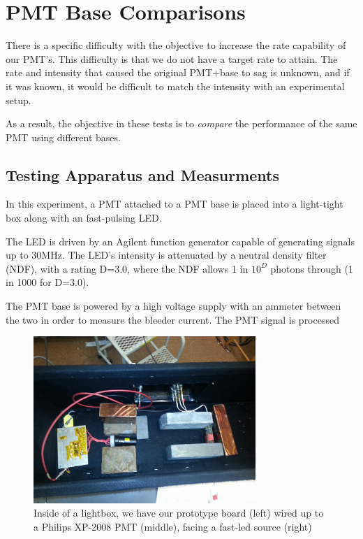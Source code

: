 \section{PMT Base Comparisons}

There is a specific difficulty with the objective to increase the rate capability of our PMT's. This difficulty is that we do not have a target rate to attain. The rate and intensity that caused the original PMT+base to sag is unknown, and if it was known, it would be difficult to match the intensity with an experimental setup.

As a result, the objective in these tests is to \emph{compare} the performance of the same PMT using different bases.

\subsection{Testing Apparatus and Measurments}

In this experiment, a PMT attached to a PMT base is placed into a light-tight box along with an fast-pulsing LED. 

The LED is driven by an Agilent function generator capable of generating signals up to 30MHz. The LED's intensity is attenuated by a neutral density filter (NDF), with a rating D=3.0, where the NDF allows 1 in $10^D$ photons through (1 in 1000 for D=3.0).

The PMT base is powered by a high voltage supply with an ammeter between the two in order to measure the bleeder current. The PMT signal is processed 

\begin{figure}[h]
	\centerline{
		\mbox{\includegraphics[width=0.75\textwidth]{figures/setup.jpg}}
	}
	\caption{Inside of a lightbox, we have our prototype board (left) wired up to a Philips XP-2008 PMT (middle), facing a fast-led source (right) }
	\label{fig:setup}
\end{figure}
